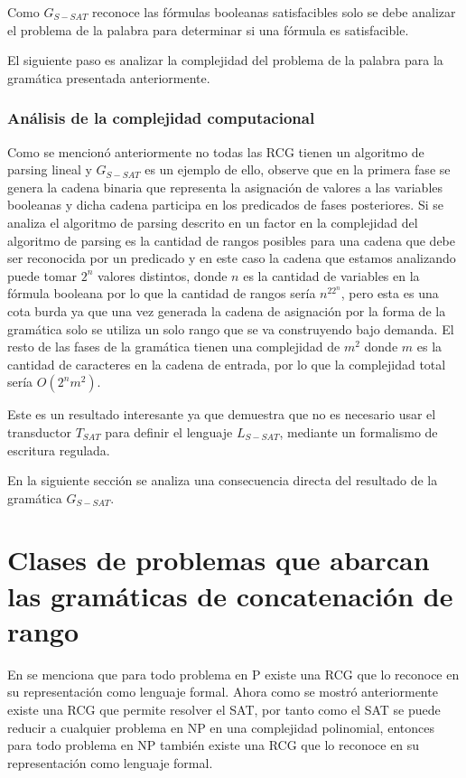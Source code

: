 \documentclass[12pt]{article}
\begin{document}
Como $G_{S-SAT}$ reconoce las fórmulas booleanas satisfacibles solo se debe analizar el problema de la
palabra para determinar si una fórmula es satisfacible.


El siguiente paso es analizar la complejidad del problema de la palabra para la gramática presentada anteriormente.

\subsubsection{Análisis de la complejidad computacional}

Como se mencionó anteriormente no todas las RCG tienen un algoritmo de parsing lineal y $G_{S-SAT}$ es un ejemplo de
ello, observe que en la primera fase se genera la cadena binaria que representa la asignación de valores a las variables
booleanas y dicha cadena participa en los predicados de fases posteriores. Si se analiza el algoritmo de parsing descrito en
\cite{mainRCGBib} un factor en la complejidad del algoritmo de parsing es la cantidad de rangos posibles para una cadena
que debe ser reconocida por un predicado y en este caso la cadena que estamos analizando puede tomar $2^n$ valores distintos, donde
$n$ es la cantidad de variables en la fórmula booleana por lo que la cantidad de rangos sería $n^22^n$, pero esta es una cota
burda ya que una vez generada la cadena de asignación por la forma de la gramática solo se utiliza un solo rango que se va construyendo
bajo demanda. El resto de las fases de la gramática tienen una complejidad de $m^2$ donde $m$ es la cantidad de caracteres
en la cadena de entrada, por lo que la complejidad total sería $O(2^nm^2)$.

Este es un resultado interesante ya que demuestra que no es necesario usar el transductor $T_{SAT}$ para definir el
lenguaje $L_{S-SAT}$, mediante un formalismo de escritura regulada.

En la siguiente sección se analiza una consecuencia directa del resultado de la gramática $G_{S-SAT}$.

\section{Clases de problemas que abarcan las gramáticas de concatenación de rango}

En \cite{propertiesRCGBib2} se menciona que para todo problema en P existe una RCG que lo reconoce en su representación
como lenguaje formal. Ahora como se mostró anteriormente existe una RCG que permite resolver el SAT, por tanto
como el SAT se puede reducir a cualquier problema en NP en una complejidad polinomial, entonces para todo
problema en NP también existe una RCG que lo reconoce en su representación como lenguaje formal.
\end{document}
